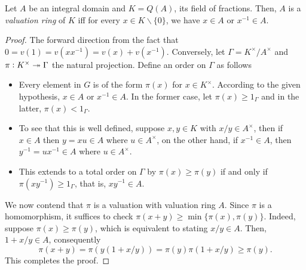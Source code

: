 \begin{proposition}
    Let $A$ be an integral domain and $K = Q(A)$, its field of fractions. Then, $A$ is a \emph{valuation ring} of $K$ iff for every $x\in K\backslash\{0\}$, we have $x\in A$ or $x^{-1}\in A$.
\end{proposition}
\begin{proof}
    The forward direction from the fact that $0 = v(1) = v(xx^{-1}) = v(x) + v(x^{-1})$. Conversely, let $\Gamma = K^\times/A^\times$ and $\pi: K^\times\twoheadrightarrow\Gamma$ the natural projection. Define an order on $\Gamma$ as follows 
    \begin{itemize}
        \item Every element in $G$ is of the form $\pi(x)$ for $x\in K^\times$. According to the given hypothesis, $x\in A$ or $x^{-1}\in A$. In the former case, let $\pi(x)\ge 1_\Gamma$ and in the latter, $\pi(x) < 1_\Gamma$.
        \item To see that this is well defined, suppose $x,y\in K$ with $x/y\in A^\times$, then if $x\in A$ then $y = xu\in A$ where $u\in A^\times$, on the other hand, if $x^{-1}\in A$, then $y^{-1} = ux^{-1}\in A$ where $u\in A^\times$.
        \item This extends to a total order on $\Gamma$ by $\pi(x)\ge\pi(y)$ if and only if $\pi(xy^{-1})\ge 1_\Gamma$, that is, $xy^{-1}\in A$.
    \end{itemize}

    We now contend that $\pi$ is a valuation with valuation ring $A$. Since $\pi$ is a homomorphism, it suffices to check $\pi(x + y)\ge\min\{\pi(x),\pi(y)\}$. Indeed, suppose $\pi(x)\ge\pi(y)$, which is equivalent to stating $x/y\in A$. Then, $1 + x/y\in A$, consequently 
    \begin{equation*}
        \pi(x + y) = \pi(y(1 + x/y)) = \pi(y)\pi(1 + x/y)\ge\pi(y).
    \end{equation*}
    This completes the proof.
\end{proof}


